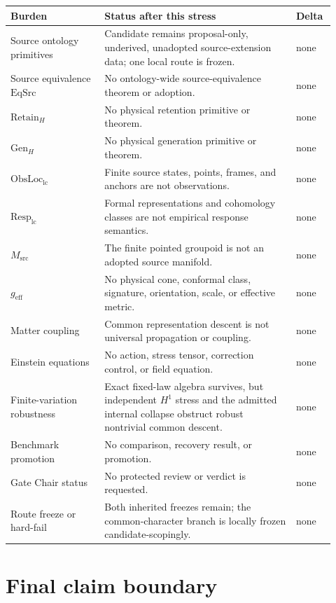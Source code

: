 \documentclass[11pt]{article}
\begin{document}
\small
\begin{longtable}{@{}P{0.27\linewidth}P{0.55\linewidth}P{0.10\linewidth}@{}}
\toprule
Burden & Status after this stress & Delta\\
\midrule
\endhead
Source ontology primitives & Candidate remains proposal-only, underived, unadopted source-extension data; one local route is frozen. & none\\
Source equivalence $\mathrm{EqSrc}$ & No ontology-wide source-equivalence theorem or adoption. & none\\
$\mathrm{Retain}_H$ & No physical retention primitive or theorem. & none\\
$\mathrm{Gen}_H$ & No physical generation primitive or theorem. & none\\
$\mathrm{ObsLoc}_{\mathrm{lc}}$ & Finite source states, points, frames, and anchors are not observations. & none\\
$\mathrm{Resp}_{\mathrm{lc}}$ & Formal representations and cohomology classes are not empirical response semantics. & none\\
$M_{\mathrm{src}}$ & The finite pointed groupoid is not an adopted source manifold. & none\\
$g_{\mathrm{eff}}$ & No physical cone, conformal class, signature, orientation, scale, or effective metric. & none\\
Matter coupling & Common representation descent is not universal propagation or coupling. & none\\
Einstein equations & No action, stress tensor, correction control, or field equation. & none\\
Finite-variation robustness & Exact fixed-law algebra survives, but independent $H^1$ stress and the admitted internal collapse obstruct robust nontrivial common descent. & none\\
Benchmark promotion & No comparison, recovery result, or promotion. & none\\
Gate Chair status & No protected review or verdict is requested. & none\\
Route freeze or hard-fail & Both inherited freezes remain; the common-character branch is locally frozen candidate-scopingly. & none\\
\bottomrule
\end{longtable}
\normalsize

\section{Final claim boundary}
\end{document}
